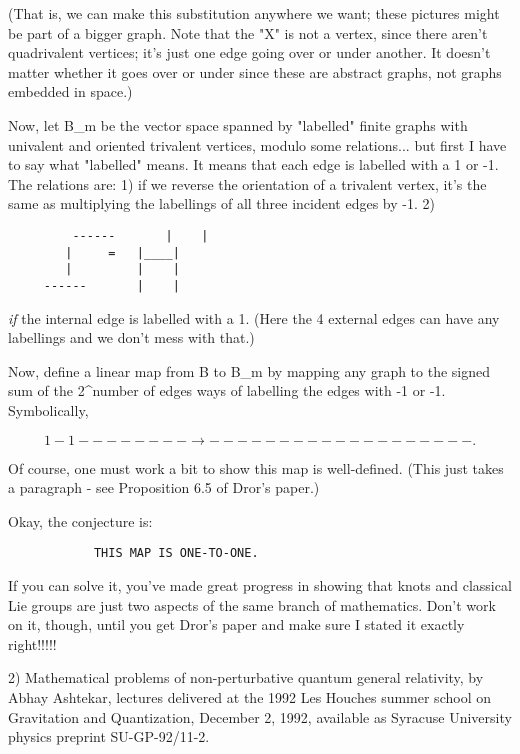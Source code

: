(That is, we can make this substitution anywhere we want; these pictures
might be part of a bigger graph.  Note that the "X" is not a vertex,
since there aren't quadrivalent vertices; it's just one edge going over
or under another.  It doesn't matter whether it goes over or under since
these are abstract graphs, not graphs embedded in space.)  

Now, let B_m be the vector space spanned by "labelled" finite graphs
with univalent and oriented trivalent vertices, modulo some relations...
but first I have to say what "labelled" means.  It means that each edge
is labelled with a 1 or -1.  The relations are: 1) if we reverse the
orientation of a trivalent vertex, it's the same as multiplying the
labellings of all three incident edges by -1.  2)   

\begin{verbatim}
         ------       |    |     
	    |     =   |____|  
	    |         |    |     
	 ------       |    |     
\end{verbatim}
    

\emph{if} the internal edge is labelled with a 1.  (Here the 4 external edges
can have any labellings and we don't mess with that.)

Now, define a linear map from B to B_m by mapping any graph to the
signed sum of the 2^{number of edges} ways of labelling the edges with -1
or -1.  Symbolically,

$$
                                1            -1
		-------- \to  ---------  -  --------- .
$$
    

Of course, one must work a bit to show this map is well-defined.  (This
just takes a paragraph - see Proposition 6.5 of Dror's paper.)  

Okay, the conjecture is:

\begin{verbatim}
			THIS MAP IS ONE-TO-ONE.

\end{verbatim}
    

If you can solve it, you've made great progress in showing that knots
and classical Lie groups are just two aspects of the same branch of
mathematics.  Don't work on it, though, until you get Dror's paper and
make sure I stated it exactly right!!!!!

2)  Mathematical problems of non-perturbative quantum general
relativity, by Abhay Ashtekar, lectures delivered at the 1992 Les
Houches summer school on Gravitation and Quantization, December 2, 1992,
available as Syracuse University physics preprint SU-GP-92/11-2. 

